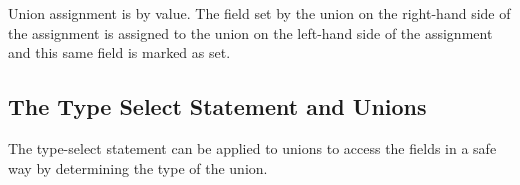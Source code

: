 Union assignment is by value.  The field set by the union on the
right-hand side of the assignment is assigned to the union on the
left-hand side of the assignment and this same field is marked as set.

\subsection{The Type Select Statement and Unions}
\label{The_Type_Select_Statement_and_Unions}

The type-select statement can be applied to unions to access the
fields in a safe way by determining the type of the union.
